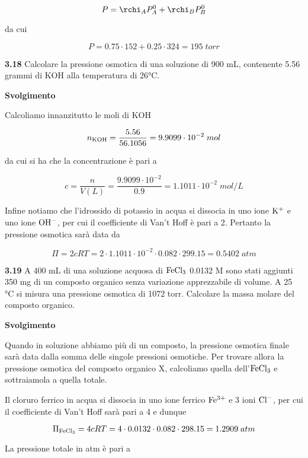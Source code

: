 $$P=\rchi_A P_A^0 + \rchi_B P_B^0$$

da cui 

$$P=0.75 \cdot 152 + 0.25 \cdot 324=195\;torr$$

\vspace{0.2cm}\textbf{3.18} Calcolare la pressione osmotica di una soluzione di 900 mL, contenente 5.56 grammi di KOH alla temperatura di 26°C.

\vspace{0.2cm}\large\textbf{Svolgimento}\normalsize

\vspace{0.2cm}Calcoliamo innanzitutto le moli di KOH

$$n_{\rm KOH}=\frac{5.56}{56.1056}=9.9099 \cdot 10^{-2}\;mol$$

da cui si ha che la concentrazione è pari a

$$c=\frac{n}{V(L)}=\frac{9.9099 \cdot 10^{-2}}{0.9}=1.1011 \cdot 10^{-2}\;mol/L$$

Infine notiamo che l'idrossido di potassio in acqua si dissocia in uno ione $\rm K^+$ e uno ione $\rm OH^-$, per cui il coefficiente di Van't Hoff è pari a 2. Pertanto la pressione osmotica sarà data da

$$\Pi=2cRT
=2 \cdot 1.1011 \cdot 10^{-2} \cdot 0.082 \cdot 299.15
=0.5402\;atm$$

\vspace{0.2cm}\textbf{3.19} A 400 mL di una soluzione acquosa di $\rm FeCl_3$ 0.0132 M sono stati aggiunti 350 mg di un composto organico senza variazione apprezzabile di volume. A 25 °C si misura una pressione osmotica di 1072 torr. Calcolare la massa molare del composto organico.

\vspace{0.2cm}\large\textbf{Svolgimento}\normalsize

\vspace{0.2cm}Quando in soluzione abbiamo più di un composto, la pressione osmotica finale sarà data dalla somma delle singole pressioni osmotiche. Per trovare allora la pressione osmotica del composto organico X, calcoliamo quella dell'$\rm FeCl_3$ e sottraiamola a quella totale.

Il cloruro ferrico in acqua si dissocia in uno ione ferrico $\rm Fe^{3+}$ e 3 ioni $\rm Cl^-$, per cui il coefficiente di Van't Hoff sarà pari a 4 e dunque

$$\Pi_{\rm FeCl_3}=4cRT
=4 \cdot 0.0132 \cdot 0.082 \cdot 298.15
=1.2909\;atm$$

La pressione totale in atm è pari a

